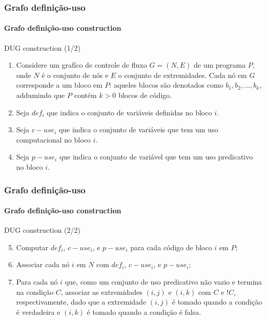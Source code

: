 \begin{frame}
\label{concept:dug-construction}
\frametitle{Grafo definição-uso}
\framesubtitle{Grafo definição-uso construction}

\begin{block:procedure}{DUG construction (1/2)}
\begin{enumerate}
	\item Considere um grafíco de controle de fluxo $G = (N, E)$ de um programa $P$, onde 
	$N$ é o conjunto de nós e $E$ o conjunto de extremidades. Cada nó em $G$ 
	corresponde a um bloco em $P$: aqueles blocos são denotados como 
	$b_1, b_2, ..., b_k$, addumindo que $P$ contém $k > 0$ blocos de código.

	\item Seja $def_i$ que indica o conjunto de variáveis definidas no bloco $i$.

	\item Seja $c-use_i$ que indica o conjunto de variáveis que tem um uso computacional no bloco $i$.

	\item Seja $p-use_i$ que indica o conjunto de variável que tem um uso predicativo no bloco $i$.
\end{enumerate}
\end{block:procedure}

\hfill
{}
\end{frame}



\begin{frame}
\frametitle{Grafo definição-uso}
\framesubtitle{Grafo definição-uso construction}

\begin{block:procedure}{DUG construction (2/2)}
\begin{enumerate}
	\setcounter{enumi}{4}
	\item Computar $def_i$, $c-use_i$, e $p-use_i$ para cada código de bloco $i$ em $P$;

	\item Associar cada nó $i$ em $N$ com $def_i$, $c-use_i$, e $p-use_i$;

	\item Para cada nó $i$ que, como um conjunto de uso predicativo não vazio e termina na 
	condição $C$, associar as extremidades $(i, j)$ e $(i, k)$ com $C$ e $!C$,
	respectivamente, dado que a extremidade $(i, j)$ é tomado quando a condição é verdadeira
	e $(i, k)$ é tomado quando a condição é falsa.
\end{enumerate}
\end{block:procedure}

\hfill
{}
\end{frame}